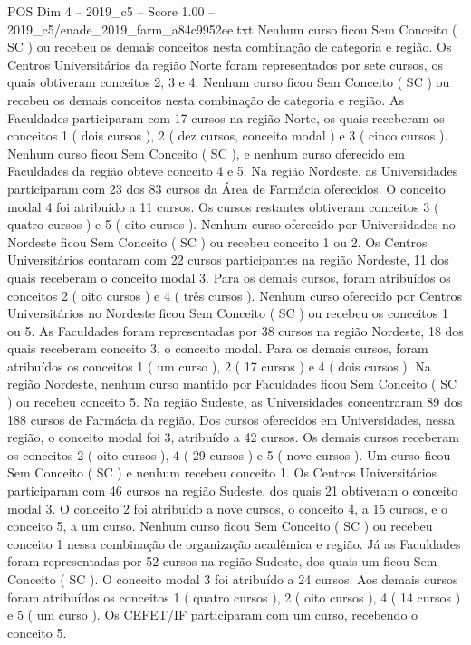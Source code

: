 \begin{textsample}{POS Dim 4 – 2019\_c5 – Score 1.00 – 2019\_c5/enade\_2019\_farm\_a84c9952ee.txt}
Nenhum curso ficou Sem Conceito ( SC ) ou recebeu os demais conceitos nesta combinação de categoria e região.
Os Centros Universitários da região Norte foram representados por sete cursos, os quais obtiveram conceitos 2, 3 e 4.
Nenhum curso ficou Sem Conceito ( SC ) ou recebeu os demais conceitos nesta combinação de categoria e região.
As Faculdades participaram com 17 cursos na região Norte, os quais receberam os conceitos 1 ( dois cursos ), 2 ( dez cursos, conceito modal ) e 3 ( cinco cursos ).
Nenhum curso ficou Sem Conceito ( SC ), e nenhum curso oferecido em Faculdades da região obteve conceito 4 e 5.
Na região Nordeste, as Universidades participaram com 23 dos 83 cursos da Área de Farmácia oferecidos.
O conceito modal 4 foi atribuído a 11 cursos.
Os cursos restantes obtiveram conceitos 3 ( quatro cursos ) e 5 ( oito cursos ).
Nenhum curso oferecido por Universidades no Nordeste ficou Sem Conceito ( SC ) ou recebeu conceito 1 ou 2.
Os Centros Universitários contaram com 22 cursos participantes na região Nordeste, 11 dos quais receberam o conceito modal 3.
Para os demais cursos, foram atribuídos os conceitos 2 ( oito cursos ) e 4 ( três cursos ).
Nenhum curso oferecido por Centros Universitários no Nordeste ficou Sem Conceito ( SC ) ou recebeu os conceitos 1 ou 5.
As Faculdades foram representadas por 38 cursos na região Nordeste, 18 dos quais receberam conceito 3, o conceito modal.
Para os demais cursos, foram atribuídos os conceitos 1 ( um curso ), 2 ( 17 cursos ) e 4 ( dois cursos ).
Na região Nordeste, nenhum curso mantido por Faculdades ficou Sem Conceito ( SC ) ou recebeu conceito 5.
Na região Sudeste, as Universidades concentraram 89 dos 188 cursos de Farmácia da região.
Dos cursos oferecidos em Universidades, nessa região, o conceito modal foi 3, atribuído a 42 cursos.
Os demais cursos receberam os conceitos 2 ( oito cursos ), 4 ( 29 cursos ) e 5 ( nove cursos ).
Um curso ficou Sem Conceito ( SC ) e nenhum recebeu conceito 1.
Os Centros Universitários participaram com 46 cursos na região Sudeste, dos quais 21 obtiveram o conceito modal 3.
O conceito 2 foi atribuído a nove cursos, o conceito 4, a 15 cursos, e o conceito 5, a um curso.
Nenhum curso ficou Sem Conceito ( SC ) ou recebeu conceito 1 nessa combinação de organização acadêmica e região.
Já as Faculdades foram representadas por 52 cursos na região Sudeste, dos quais um ficou Sem Conceito ( SC ).
O conceito modal 3 foi atribuído a 24 cursos.
Aos demais cursos foram atribuídos os conceitos 1 ( quatro cursos ), 2 ( oito cursos ), 4 ( 14 cursos ) e 5 ( um curso ).
Os CEFET/IF participaram com um curso, recebendo o conceito 5.

\end{textsample}
